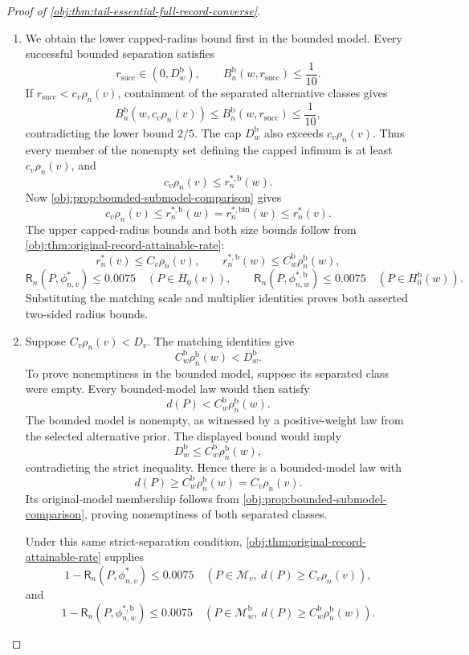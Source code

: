 \documentclass[11pt]{article}
\begin{document}
\begin{proof}[Proof of \cref{obj:thm:tail-essential-full-record-converse}]
\begin{enumerate}
\item
We obtain the lower capped-radius bound first in the bounded model.
Every successful bounded separation satisfies
\[
r_{\mathrm{succ}}\in(0,D_w^{\mathrm b}),
\qquad
B_n^{\mathrm b}(w,r_{\mathrm{succ}})\le\frac1{10}.
\]
If \(r_{\mathrm{succ}}<c_v\rho_n(v)\), containment of the separated
alternative classes gives
\[
B_n^{\mathrm b}(w,c_v\rho_n(v))
\le B_n^{\mathrm b}(w,r_{\mathrm{succ}})
\le\frac1{10},
\]
contradicting the lower bound \(2/5\). The cap
\(D_w^{\mathrm b}\) also exceeds \(c_v\rho_n(v)\). Thus every member of
the nonempty set defining the capped infimum is at least
\(c_v\rho_n(v)\), and
\[
c_v\rho_n(v)\le r_n^{*,\mathrm b}(w).
\]
Now \cref{obj:prop:bounded-submodel-comparison} gives
\[
c_v\rho_n(v)
\le r_n^{*,\mathrm b}(w)
=r_n^{*,\mathrm{bin}}(w)
\le r_n^*(v).
\]
The upper capped-radius bounds and both size bounds follow from
\cref{obj:thm:original-record-attainable-rate}:
\[
r_n^*(v)\le C_v\rho_n(v),\qquad
r_n^{*,\mathrm b}(w)\le C_w^{\mathrm b}\rho_n^{\mathrm b}(w),
\]
\[
\mathsf R_n(P,\phi^*_{n,v})\le0.0075
\quad(P\in H_0(v)),\qquad
\mathsf R_n(P,\phi^{*,\mathrm b}_{n,w})\le0.0075
\quad(P\in H_0^{\mathrm b}(w)).
\]
Substituting the matching scale and multiplier identities proves both
asserted two-sided radius bounds.

\item
Suppose \(C_v\rho_n(v)<D_v\). The matching identities give
\[
C_w^{\mathrm b}\rho_n^{\mathrm b}(w)<D_w^{\mathrm b}.
\]
To prove nonemptiness in the bounded model, suppose its separated class
were empty. Every bounded-model law would then satisfy
\[
d(P)<C_w^{\mathrm b}\rho_n^{\mathrm b}(w).
\]
The bounded model is nonempty, as witnessed by a positive-weight law
from the selected alternative prior. The displayed bound would imply
\[
D_w^{\mathrm b}
\le C_w^{\mathrm b}\rho_n^{\mathrm b}(w),
\]
contradicting the strict inequality. Hence there is a bounded-model law
with
\[
d(P)\ge C_w^{\mathrm b}\rho_n^{\mathrm b}(w)=C_v\rho_n(v).
\]
Its original-model membership follows from
\cref{obj:prop:bounded-submodel-comparison}, proving nonemptiness of both
separated classes.

Under this same strict-separation condition,
\cref{obj:thm:original-record-attainable-rate} supplies
\[
1-\mathsf R_n(P,\phi^*_{n,v})\le0.0075
\quad(P\in\mathcal M_v,\ d(P)\ge C_v\rho_n(v)),
\]
and
\[
1-\mathsf R_n(P,\phi^{*,\mathrm b}_{n,w})\le0.0075
\quad
(P\in\mathcal M_w^{\mathrm b},\
d(P)\ge C_w^{\mathrm b}\rho_n^{\mathrm b}(w)).
\]


\end{enumerate}
\end{proof}
\end{document}
